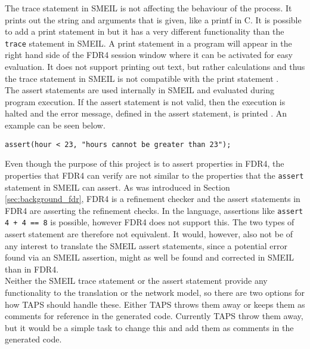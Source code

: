 The trace statement in SMEIL is not affecting the behaviour of the process. It prints out the string and arguments that is given, like a printf in C. It is possible to add a print statement in \cspm{} but it has a very different functionality than the \texttt{trace} statement in SMEIL. A print statement in a \cspm{} program will appear in the right hand side of the FDR4 session window where it can be activated for easy evaluation. It does not support printing out text, but rather calculations and thus the trace statement in SMEIL is not compatible with the print statement \cspm.\\

The assert statements are used internally in SMEIL and evaluated during program execution. If the assert statement is not valid, then the execution is halted and the error message, defined in the assert statement, is printed . An example can be seen below.
\begin{verbatim}
assert(hour < 23, "hours cannot be greater than 23");
\end{verbatim}
Even though the purpose of this project is to assert properties in FDR4, the properties that FDR4 can verify are not similar to the properties that the \texttt{assert} statement in SMEIL can assert. As was introduced in Section \ref{sec:background_fdr}, FDR4 is a refinement checker and the assert statements in FDR4 are asserting the refinement checks. In the \cspm language, assertions like \texttt{assert 4 + 4 == 8} is possible, however FDR4 does not support this\cite{fdr4}. The two types of assert statement are therefore not equivalent. It would, however, also not be of any interest to translate the SMEIL assert statements, since a potential error found via an SMEIL assertion, might as well be found and corrected in SMEIL than in FDR4.\\

Neither the SMEIL trace statement or the assert statement provide any functionality to the translation or the network model, so there are two options for how TAPS should handle these. Either TAPS throws them away or keeps them as comments for reference in the generated code. Currently TAPS throw them away, but it would be a simple task to change this and add them as comments in the generated \cspm{} code.\\

